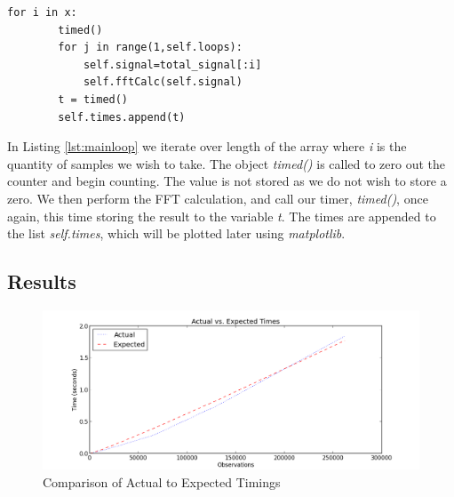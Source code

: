 \begin{lstlisting}[caption={Main Loop Execution},label=lst:mainloop,firstnumber=45]
    for i in x:
        timed()
        for j in range(1,self.loops):
            self.signal=total_signal[:i]
            self.fftCalc(self.signal)
        t = timed()
        self.times.append(t)
\end{lstlisting}
In Listing \ref{lst:mainloop} we iterate over length of the array where \emph{i} is the quantity of samples we wish to take. The object \emph{timed()} is called to zero out the counter and begin counting. The value is not stored as we do not wish to store a zero. We then perform the FFT calculation, and call our timer, \emph{timed()}, once again, this time storing the result to the variable \emph{t}. The times are appended to the list \emph{self.times}, which will be plotted later using \emph{matplotlib}.

\subsection{Results} %
\label{fig:resultA}

\begin{figure}[H]
    \centering
        \includegraphics[width=6.5in]{./include/assignment1data.png}
    \caption{Comparison of Actual to Expected Timings}
    \label{fig:exactvsexpt}
\end{figure}\noindent

